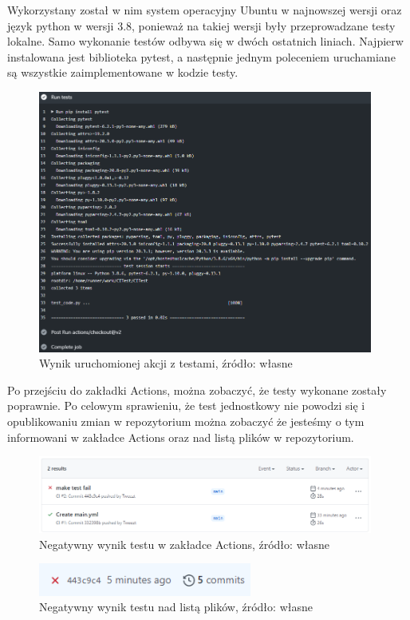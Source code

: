 Wykorzystany został w nim system operacyjny Ubuntu w najnowszej wersji oraz język python w wersji 3.8, ponieważ na takiej wersji były przeprowadzane testy lokalne. Samo wykonanie testów odbywa się w dwóch ostatnich liniach. Najpierw instalowana jest biblioteka pytest, a następnie jednym poleceniem uruchamiane są wszystkie zaimplementowane w kodzie testy. 

\begin{figure}[htbp]
    \centering
    \includegraphics[width=11cm]{images/testingCI3.png}
    \caption{Wynik uruchomionej akcji z testami, źródło: własne}
    \label{fig:ci3}
\end{figure}

Po przejściu do zakładki Actions, można zobaczyć, że testy wykonane zostały poprawnie. 
Po celowym sprawieniu, że test jednostkowy nie powodzi się i opublikowaniu zmian w repozytorium można zobaczyć że jesteśmy o tym informowani w zakładce Actions oraz nad listą plików w repozytorium. 

\begin{figure}[htbp]
    \centering
    \includegraphics[width=11cm]{images/testingCI4.png}
    \caption{Negatywny wynik testu w zakładce Actions, źródło: własne}
    \label{fig:ci4}
\end{figure}

\begin{figure}[htbp]
    \centering
    \includegraphics[width=7cm]{images/testingCI5.png}
    \caption{Negatywny wynik testu nad listą plików, źródło: własne}
    \label{fig:ci5}
\end{figure}

